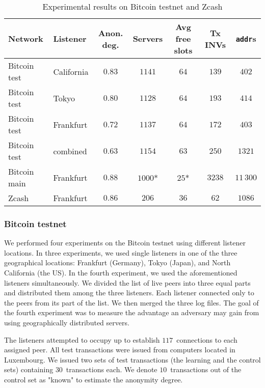\begin{table*}[!t]
	\normalsize
	\caption{Experimental results on Bitcoin testnet and Zcash}
	\centering
	\begin{tabular}{|l|l|c|c|c|c|c|}
		\hline
		Network & Listener & Anon\@. deg. & Servers & Avg free slots & Tx INVs & \texttt{addr}s \\
		\hline
		Bitcoin test & California & $0.83$ & $1141$ & $64$ & $139$ & $402$ \\
		Bitcoin test & Tokyo & $0.80$ & $1128$ & $64$ & $193$ & $414$ \\
		Bitcoin test & Frankfurt & $0.72$ & $1137$ & $64$ & $172$ & $403$ \\
		Bitcoin test & combined & $0.63$ & $1154$ & $63$ & $250$ & $1321$ \\
		Bitcoin main & Frankfurt & $0.88$ & $1000$* & $25$* & $3238$ & $11\,300$ \\
		Zcash & Frankfurt & $0.86$ & $206$ & $36$ & $62$ & $1086$ \\
		\hline
	\end{tabular}
	\label{tab:results}
\end{table*}

\subsubsection{Bitcoin testnet}

We performed four experiments on the Bitcoin testnet using different listener locations.
In three experiments, we used single listeners in one of the three geographical locations: Frankfurt (Germany), Tokyo (Japan), and North California (the US).
In the fourth experiment, we used the aforementioned listeners simultaneously.
We divided the list of live peers into three equal parts and distributed them among the three listeners.
Each listener connected only to the peers from its part of the list.
We then merged the three log files.
The goal of the fourth experiment was to measure the advantage an adversary may gain from using geographically distributed servers.

The listeners attempted to occupy up to establish $117$~connections to each assigned peer.
All test transactions were issued from computers located in Luxembourg.
We issued two sets of test transactions (the learning and the control sets) containing $30$~transactions each.
We denote $10$~transactions out of the control set as "known" to estimate the anonymity degree.

